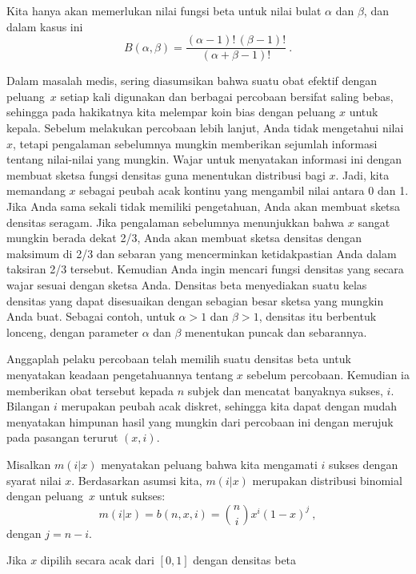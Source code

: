 
Kita hanya akan memerlukan nilai fungsi beta untuk nilai bulat
$\alpha$ dan $\beta$, dan dalam kasus ini
$$
B(\alpha,\beta) = \frac{(\alpha - 1)!\,(\beta - 1)!}{(\alpha + \beta - 1)!}\ .
$$

\begin{example}\label{exam 4.16}
Dalam masalah medis, sering diasumsikan bahwa suatu obat efektif dengan
peluang~$x$ setiap kali digunakan dan berbagai percobaan bersifat
saling bebas, sehingga pada hakikatnya kita melempar koin bias dengan peluang
$x$ untuk kepala.  
Sebelum melakukan percobaan lebih lanjut, Anda tidak mengetahui nilai $x$, tetapi pengalaman sebelumnya mungkin memberikan
sejumlah informasi tentang nilai-nilai yang mungkin. Wajar untuk menyatakan informasi ini
dengan membuat sketsa fungsi densitas
guna menentukan distribusi bagi $x$.  Jadi, kita memandang $x$ sebagai peubah acak
kontinu yang mengambil nilai antara 0 dan 1.  Jika Anda sama sekali tidak memiliki pengetahuan, Anda akan
membuat sketsa densitas seragam.  Jika pengalaman sebelumnya menunjukkan bahwa
$x$ sangat mungkin berada dekat 2/3, Anda akan membuat sketsa densitas dengan maksimum di 2/3 dan
sebaran yang mencerminkan ketidakpastian Anda dalam taksiran 2/3 tersebut. Kemudian Anda ingin mencari
fungsi densitas yang secara wajar sesuai dengan sketsa Anda.  Densitas beta menyediakan suatu kelas
densitas yang dapat disesuaikan dengan sebagian besar sketsa yang mungkin Anda buat. Sebagai contoh, untuk
$\alpha > 1$ dan $\beta > 1$, densitas itu berbentuk lonceng, dengan parameter $\alpha$ dan $\beta$
menentukan puncak dan sebarannya. 
\par
Anggaplah pelaku percobaan telah memilih suatu densitas beta untuk menyatakan keadaan
pengetahuannya tentang $x$ sebelum percobaan.  Kemudian ia memberikan obat tersebut kepada $n$
subjek dan mencatat banyaknya sukses, $i$.   Bilangan $i$ merupakan peubah acak
diskret, sehingga kita dapat dengan mudah menyatakan himpunan hasil yang mungkin dari percobaan ini
dengan merujuk pada pasangan terurut $(x, i)$.
\par
Misalkan $m(i|x)$ menyatakan peluang bahwa kita mengamati $i$ sukses dengan syarat nilai $x$.  Berdasarkan
asumsi kita, $m(i|x)$ merupakan distribusi binomial dengan peluang~$x$ untuk sukses:
$$
m(i|x) = b(n,x,i) = {n \choose i} x^i(1 - x)^j\ ,
$$
dengan $j = n - i$.  
\par
Jika $x$ dipilih secara acak dari $[0,1]$ dengan densitas beta

\end{example}
